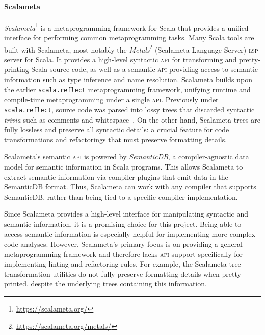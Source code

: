 \documentclass[../../main.tex]{subfiles}
\begin{document}
\paragraph{Scalameta}
\textit{Scalameta}\footnote{\url{https://scalameta.org/}} is a metaprogramming framework for Scala that provides a unified interface for performing common metaprogramming tasks.
Many Scala tools are built with Scalameta, most notably the \emph{Metals}\footnote{\url{https://scalameta.org/metals/}} (Scala\underline{meta} \underline{L}anguage \underline{S}erver) \textsc{lsp} server for Scala.
It provides a high-level syntactic \textsc{api} for transforming and pretty-printing Scala source code, as well as a semantic \textsc{api} providing access to semantic information such as type inference and name resolution.
Scalameta builds upon the earlier \texttt{scala.reflect} metaprogramming framework, unifying runtime and compile-time metaprogramming under a single \textsc{api}.
Previously under \texttt{scala.reflect}, source code was parsed into lossy trees that discarded syntactic \emph{trivia} such as comments and whitespace~\cite{burmako_scalameta_2017}.
On the other hand, Scalameta trees are fully lossless and preserve all syntactic details: a crucial feature for code transformations and refactorings that must preserve formatting details.

Scalameta's semantic \textsc{api} is powered by \textit{SemanticDB}, a compiler-agnostic data model for semantic information in Scala programs.
This allows Scalameta to extract semantic information via compiler plugins that emit data in the SemanticDB format.
Thus, Scalameta can work with any compiler that supports SemanticDB, rather than being tied to a specific compiler implementation.

Since Scalameta provides a high-level interface for manipulating syntactic and semantic information, it is a promising choice for this project.
Being able to access semantic information is especially helpful for implementing more complex code analyses.
However, Scalameta's primary focus is on providing a general metaprogramming framework and therefore lacks \textsc{api} support specifically for implementing linting and refactoring rules.
For example, the Scalameta tree transformation utilities do not fully preserve formatting details when pretty-printed, despite the underlying trees containing this information.
\end{document}
